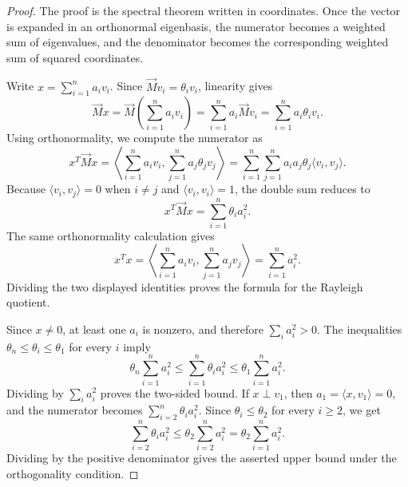 \begin{proof}
	The proof is the spectral theorem written in coordinates. Once the vector is expanded in an orthonormal eigenbasis, the numerator becomes a weighted sum of eigenvalues, and the denominator becomes the corresponding weighted sum of squared coordinates.

	Write \(x=\sum_{i=1}^n a_i v_i\). Since \(\vec{M}v_i=\theta_i v_i\), linearity gives
	\begin{equation}
		\vec{M}x=\vec{M}\left(\sum_{i=1}^n a_i v_i\right)=\sum_{i=1}^n a_i\vec{M}v_i=\sum_{i=1}^n a_i\theta_i v_i.
	\end{equation}
	Using orthonormality, we compute the numerator as
	\begin{equation}
		x^T\vec{M}x
		=
		\left\langle \sum_{i=1}^n a_i v_i,\sum_{j=1}^n a_j\theta_j v_j\right\rangle
		=
		\sum_{i=1}^n\sum_{j=1}^n a_i a_j\theta_j\langle v_i,v_j\rangle.
	\end{equation}
	Because \(\langle v_i,v_j\rangle=0\) when \(i\neq j\) and \(\langle v_i,v_i\rangle=1\), the double sum reduces to
	\begin{equation}
		x^T\vec{M}x=\sum_{i=1}^n\theta_i a_i^2.
	\end{equation}
	The same orthonormality calculation gives
	\begin{equation}
		x^T x
		=
		\left\langle \sum_{i=1}^n a_i v_i,\sum_{j=1}^n a_j v_j\right\rangle
		=
		\sum_{i=1}^n a_i^2.
	\end{equation}
	Dividing the two displayed identities proves the formula for the Rayleigh quotient.

	Since \(x\neq 0\), at least one \(a_i\) is nonzero, and therefore \(\sum_i a_i^2>0\). The inequalities \(\theta_n\leq \theta_i\leq \theta_1\) for every \(i\) imply
	\begin{equation}
		\theta_n\sum_{i=1}^n a_i^2\leq \sum_{i=1}^n\theta_i a_i^2\leq \theta_1\sum_{i=1}^n a_i^2.
	\end{equation}
	Dividing by \(\sum_i a_i^2\) proves the two-sided bound. If \(x\perp v_1\), then \(a_1=\langle x,v_1\rangle=0\), and the numerator becomes \(\sum_{i=2}^n\theta_i a_i^2\). Since \(\theta_i\leq\theta_2\) for every \(i\geq 2\), we get
	\begin{equation}
		\sum_{i=2}^n\theta_i a_i^2\leq \theta_2\sum_{i=2}^n a_i^2=\theta_2\sum_{i=1}^n a_i^2.
	\end{equation}
	Dividing by the positive denominator gives the asserted upper bound under the orthogonality condition.
\end{proof}

